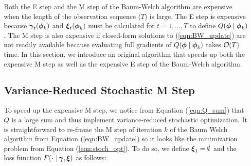 Both the E step and the M step of the Baum-Welch algorithm are expensive when the length of the observation sequence ($T$) is large. The E step is expensive because $\boldsymbol{\gamma}_t(\boldsymbol{\phi}_{k})$ and $\boldsymbol{\xi}_t(\boldsymbol{\phi}_{k})$ must be calculated for $t = 1,\ldots,T$ to define $Q(\boldsymbol{\phi} \mid \boldsymbol{\phi}_k)$. The M step is also expensive if closed-form solutions to (\ref{eqn:BW_update}) are not readily available because evaluating full gradients of $Q(\boldsymbol{\phi} \mid \boldsymbol{\phi}_{k})$ takes $\mathcal{O}(T)$ time. In this section, we introduce an original algorithm that speeds up both the expensive M step as well as the expensive E step of the Baum-Welch algorithm. %

\subsection{Variance-Reduced Stochastic M Step}
\label{subsec:stoch_M}

To speed up the expensive M step, we notice from Equation (\ref{eqn:Q_sum}) that $Q$ is a large sum and thus implement variance-reduced stochastic optimization. It is straightforward to re-frame the M step of iteration $k$ of the Baum Welch algorithm from Equation (\ref{eqn:BW_update}) so it looks like the minimization problem from Equation (\ref{eqn:stoch_opt}). To do so, we define $\boldsymbol{\xi}_1 = \emptyset$ and the loss function $F(\cdot \mid \boldsymbol{\gamma},\boldsymbol{\xi})$ as follows:

